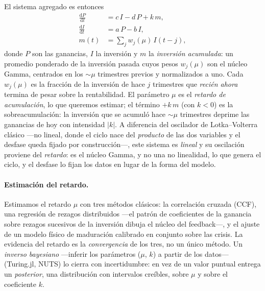 \documentclass[11pt]{article}
\begin{document}
El sistema agregado es entonces
\begin{equation}
\begin{aligned}
\frac{\mathrm{d}P}{\mathrm{d}t} &= c\,I - d\,P + k\,m,\\
\frac{\mathrm{d}I}{\mathrm{d}t} &= a\,P - b\,I,\\
m(t) &= \sum_j w_j(\mu)\,I(t-j),
\end{aligned}
\end{equation}
donde $P$ son las ganancias, $I$ la inversión y $m$ la \emph{inversión acumulada}: un promedio
ponderado de la inversión pasada cuyos pesos $w_j(\mu)$ son el núcleo Gamma, centrados en los
$\sim\mu$ trimestres previos y normalizados a uno. Cada $w_j(\mu)$ es la fracción de la inversión de
hace $j$ trimestres que \emph{recién ahora} termina de pesar sobre la rentabilidad. El parámetro
$\mu$ es el \emph{retardo de acumulación}, lo que queremos estimar; el término $+k\,m$ (con $k<0$) es la
sobreacumulación: la inversión que se acumuló hace $\sim\mu$ trimestres deprime las ganancias de hoy
con intensidad $|k|$. A diferencia del oscilador de Lotka--Volterra clásico ---no lineal, donde el
ciclo nace del \emph{producto} de las dos variables y el desfase queda fijado por construcción---,
este sistema es \emph{lineal} y su oscilación proviene del \emph{retardo}: es el núcleo Gamma, y no
una no linealidad, lo que genera el ciclo, y el desfase lo fijan los datos en lugar de la forma del
modelo.

\paragraph{Estimación del retardo.} Estimamos el retardo $\mu$ con tres métodos clásicos: la correlación cruzada (CCF), una regresión de
rezagos distribuidos ---el patrón de coeficientes de la ganancia sobre rezagos sucesivos de la
inversión dibuja el núcleo del feedback---, y el ajuste de un modelo físico de maduración calibrado
en conjunto sobre las crisis. La evidencia del retardo es
la \emph{convergencia} de los tres, no un único método. Un \emph{inverso bayesiano} ---inferir los
parámetros ($\mu$, $k$) a partir de los datos--- (Turing.jl, NUTS) lo cierra con incertidumbre: en
vez de un valor puntual entrega un \emph{posterior}, una distribución con intervalos creíbles, sobre
$\mu$ y sobre el coeficiente $k$.
\end{document}
